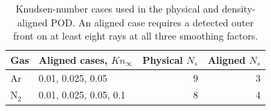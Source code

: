 \begin{table}
\centering\small
\caption{Knudsen-number cases used in the physical and density-aligned POD. An aligned case requires a detected outer front on at least eight rays at all three smoothing factors.}\label{tab:app_marker_alternatives}
\begin{tabular}{llrr}\toprule
Gas & Aligned cases, $Kn_\infty$ & Physical $N_s$ & Aligned $N_s$\\\midrule
Ar & 0.01, 0.025, 0.05 & 9 & 3\\
N$_2$ & 0.01, 0.025, 0.05, 0.1 & 8 & 4\\
\bottomrule\end{tabular}
\end{table}
